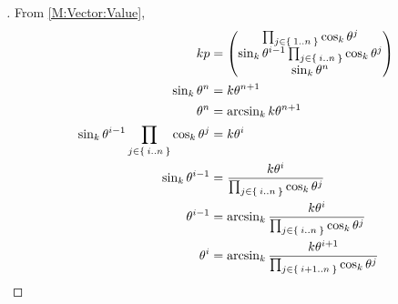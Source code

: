 \documentclass[../main.tex]{subfiles}
\begin{document}
\begin{proof}[]
    From \cref{M:Vector:Value},
    \begin{align*}
        kp                                                                                 & = \begin{pmatrix}
                                                                                                   \prod_{j\in\Set{1..n}}{\cos_k{\tensor{\theta}{^j}}}                                \\
                                                                                                   \sin_k{\tensor{\theta}{^{i-1}}}\prod_{j\in\Set{i..n}}{\cos_k{\tensor{\theta}{^j}}} \\
                                                                                                   \sin_k{{\tensor{\theta}{^n}}}                                                      \\
                                                                                               \end{pmatrix}                \\
        \sin_k{{\tensor{\theta}{^n}}}                                                      & = k\tensor{\theta}{^{n+1}}                                                                                            \\
        \tensor{\theta}{^n}                                                                & = \arcsin_k{k\tensor{\theta}{^{n+1}}}                                                                                 \\
        \sin_k{\tensor{\theta}{^{i-1}}}\prod_{j\in\Set{i..n}}{\cos_k{\tensor{\theta}{^j}}} & = k\tensor{\theta}{^{i}}                                                                                              \\
        \sin_k{\tensor{\theta}{^{i-1}}}                                                    & = \frac{k\tensor{\theta}{^{i}}}{\prod_{j\in\Set{i..n}}{\cos_k{\tensor{\theta}{^j}}}}                                  \\
        \tensor{\theta}{^{i-1}}                                                            & = \arcsin_k{\frac{k\tensor{\theta}{^{i}}}{\prod_{j\in\Set{i..n}}{\cos_k{\tensor{\theta}{^j}}}}}                       \\
        \tensor{\theta}{^i}                                                                & = \arcsin_k{\frac{k\tensor{\theta}{^{i+1}}}{\prod_{j\in\Set{i+1..n}}{\cos_k{\tensor{\theta}{^j}}}}}                   \\

\end{align*}
\end{proof}
\end{document}
